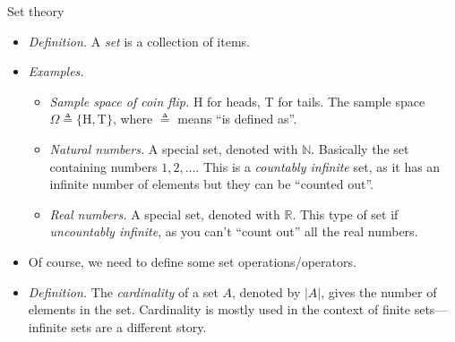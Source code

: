 \documentclass{beamer}
\begin{document}
\begin{frame}{Set theory}
    \begin{itemize}
        \item
        \textit{Definition.} A \textit{set} is a collection of items.

        \item
        \textit{Examples.}
        \begin{itemize}
            \item
            \textit{Sample space of coin flip.} H for heads, T for tails. The
            sample space $ \Omega \triangleq \{\text{H}, \text{T}\} $, where
            $ \triangleq $ means ``is defined as''.

            \item
            \textit{Natural numbers.} A special set, denoted with
            $ \mathbb{N} $. Basically the set containing numbers
            $ 1, 2, \ldots $. This is a \textit{countably infinite} set, as it
            has an infinite number of elements but they can be ``counted out''.

            \item
            \textit{Real numbers.} A special set, denoted with $ \mathbb{R} $.
            This type of set if \textit{uncountably infinite}, as you can't
            ``count out'' all the real numbers.
        \end{itemize}
        \item
        Of course, we need to define some set operations/operators.

        \item
        \textit{Definition.} The \textit{cardinality} of a set $ A $, denoted
        by $ |A| $, gives the number of elements in the set. Cardinality is
        mostly used in the context of finite sets---infinite sets are a
        different story.
    \end{itemize}
\end{frame}
\end{document}

